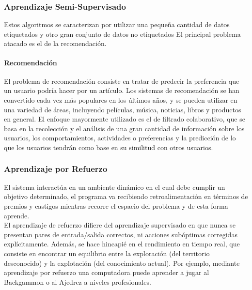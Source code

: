 \documentclass[a4paper,11pt,spanish]{book}
\begin{document}
      \subsubsection{Aprendizaje Semi-Supervisado}
	Estos algoritmos se caracterizan por utilizar una pequeña cantidad de datos etiquetados y otro gran conjunto de datos no etiquetados
	El principal problema atacado es el de la recomendación.
	\paragraph{Recomendación}
	  El problema de recomendación consiste en tratar de predecir la preferencia que un usuario podría hacer por un artículo. Los sistemas de recomendación se han convertido cada
	  vez más populares en los últimos años, y se pueden utilizar en una variedad de áreas, incluyendo películas, música, noticias, libros y productos en general.
	  El enfoque mayormente utilizado es el de filtrado colaborativo, que se basa en la recolección y el análisis de una gran cantidad de información sobre los usuarios,
	  los comportamientos, actividades o preferencias y la predicción de lo que los usuarios tendrán como base en su similitud con otros usuarios.

      \subsubsection{Aprendizaje por Refuerzo}
	El sistema interactúa en un ambiente dinámico en el cual debe cumplir un objetivo determinado, el programa va recibiendo retroalimentación en términos de premios y castigos mientras
	recorre el espacio del problema y de esta forma aprende.\\
	El aprendizaje de refuerzo difiere del aprendizaje supervisado en que nunca se presentan pares de entrada/salida correctos, ni acciones subóptimas corregidas explícitamente.
	Además, se hace hincapié en el rendimiento en tiempo real, que consiste en encontrar un equilibrio entre la exploración (del territorio desconocido) y la explotación
	(del conocimiento actual).
	Por ejemplo, mediante aprendizaje por refuerzo una computadora puede aprender a jugar al Backgammon o al Ajedrez a niveles profesionales.
\end{document}
